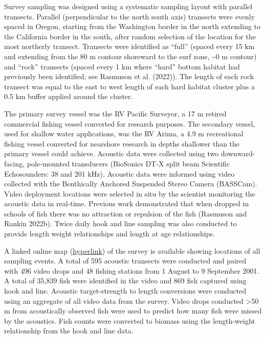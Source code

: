 \documentclass[11pt,
  english,
  letterpaper,
]{article}
\begin{document}
Survey sampling was designed using a systematic sampling layout with parallel transects. Parallel (perpendicular to the north south axis) transects were evenly spaced in Oregon, starting from the Washington border in the north extending to the California border in the south, after random selection of the location for the most northerly transect. Transects were identified as ``full'' (spaced every 15 km and extending from the 80 m contour shoreward to the surf zone, \textasciitilde0 m contour) and ``rock'' transects (spaced every 1 km where ``hard'' bottom habitat had previously been identified; see Rasmuson et al. (2022)). The length of each rock transect was equal to the east to west length of each hard habitat cluster plus a 0.5 km buffer applied around the cluster.

The primary survey vessel was the RV Pacific Surveyor, a 17 m retired commercial fishing vessel converted for research purposes. The secondary vessel, used for shallow water applications, was the RV Arima, a 4.9 m recreational fishing vessel converted for nearshore research in depths shallower than the primary vessel could achieve. Acoustic data were collected using two downward-facing, pole-mounted transducers (BioSonics DT-X split beam Scientific Echosounders: 38 and 201 kHz). Acoustic data were informed using video collected with the Benthically Anchored Suspended Stereo Camera (BASSCam). Video deployment locations were selected in situ by the scientist monitoring the acoustic data in real-time. Previous work demonstrated that when dropped in schools of fish there was no attraction or repulsion of the fish (Rasmuson and Rankin 2022b). Twice daily hook and line sampling was also conducted to provide length weight relationships and length at age relationships.

A linked online map (\href{https://www.arcgis.com/apps/mapviewer/index.html?webmap=49e8f3a8079448c29a21d4384d2b50dd}{hyperlink}) of the survey is available showing locations of all sampling events. A total of 595 acoustic transects were conducted and paired with 496 video drops and 48 fishing stations from 1 August to 9 September 2001. A total of 35,839 fish were identified in the video and 869 fish captured using hook and line. Acoustic target-strength to length conversions were conducted using an aggregate of all video data from the survey. Video drops conducted \textgreater50 m from acoustically observed fish were used to predict how many fish were missed by the acoustics. Fish counts were converted to biomass using the length-weight relationship from the hook and line data.
\end{document}
